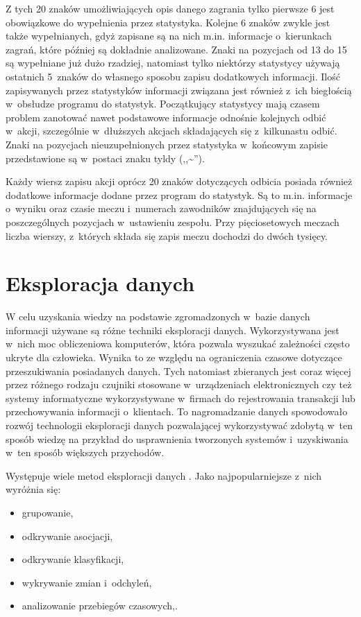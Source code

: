 \documentclass[a4paper,twoside,12pt]{book}
\begin{document}
Z tych 20 znaków umożliwiających opis danego zagrania tylko pierwsze 6 jest obowiązkowe do wypełnienia przez statystyka. Kolejne 6 znaków zwykle jest także wypełnianych, gdyż zapisane są na nich m.in. informacje o~kierunkach zagrań, które później są dokładnie analizowane. Znaki na pozycjach od 13 do 15 są wypełniane już dużo rzadziej, natomiast tylko niektórzy statystycy używają ostatnich 5~znaków do własnego sposobu zapisu dodatkowych informacji. Ilość zapisywanych przez statystyków informacji związana jest również z~ich biegłością w~obsłudze programu do statystyk. Początkujący statystycy mają czasem problem zanotować nawet podstawowe informacje odnośnie kolejnych odbić w~akcji, szczególnie w~dłuższych akcjach składających się z~kilkunastu odbić. Znaki na pozycjach nieuzupełnionych przez statystyka w~końcowym zapisie przedstawione są w~postaci znaku tyldy (,,\textasciitilde'').

Każdy wiersz zapisu akcji oprócz 20 znaków dotyczących odbicia posiada również dodatkowe informacje dodane przez program do statystyk. Są to m.in. informacje o~wyniku oraz czasie meczu i~numerach zawodników znajdujących się na poszczególnych pozycjach w~ustawieniu zespołu. Przy pięciosetowych meczach liczba wierszy, z~których składa się zapis meczu dochodzi do dwóch tysięcy.

\section{Eksploracja danych}
\label{roz:eksploracja-danych}
W celu uzyskania wiedzy na podstawie zgromadzonych w~bazie danych informacji używane są różne techniki eksploracji danych. Wykorzystywana jest w~nich moc obliczeniowa komputerów, która pozwala wyszukać zależności często ukryte dla człowieka. Wynika to ze względu na ograniczenia czasowe dotyczące przeszukiwania posiadanych danych. Tych natomiast zbieranych jest coraz więcej przez różnego rodzaju czujniki stosowane w~urządzeniach elektronicznych czy też systemy informatyczne wykorzystywane w~firmach do rejestrowania transakcji lub przechowywania informacji o~klientach. To nagromadzanie danych spowodowało rozwój technologii eksploracji danych pozwalającej wykorzystywać zdobytą w~ten sposób wiedzę na przykład do usprawnienia tworzonych systemów i~uzyskiwania w~ten sposób większych przychodów.

Występuje wiele metod eksploracji danych \cite{bib:przegladKlasyfikacji}. Jako najpopularniejsze z~nich wyróżnia się:
\begin{itemize}
\item grupowanie,
\item odkrywanie asocjacji,
\item odkrywanie klasyfikacji,
\item wykrywanie zmian i~odchyleń,
\item analizowanie przebiegów czasowych,.
\end{itemize}
\end{document}
